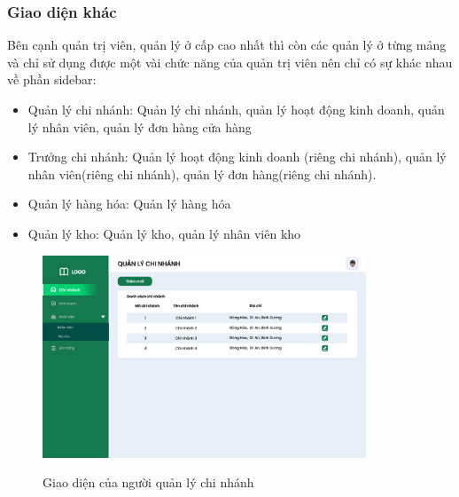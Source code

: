     \subsubsection{Giao diện khác}
        Bên cạnh quản trị viên, quản lý ở cấp cao nhất thì còn các quản lý ở từng mảng và chỉ sử dụng được một vài chức năng của quản trị viên nên chỉ có sự khác nhau về phần sidebar:
        \begin{itemize}
            \item Quản lý chi nhánh: Quản lý chi nhánh, quản lý hoạt động kinh doanh, quản lý nhân viên, quản lý đơn hàng cửa hàng
            \item Trưởng chi nhánh: Quản lý hoạt động kinh doanh (riêng chi nhánh), quản lý nhân viên(riêng chi nhánh), quản lý đơn hàng(riêng chi nhánh).
            \item Quản lý hàng hóa: Quản lý hàng hóa
            \item Quản lý kho: Quản lý kho, quản lý nhân viên kho
        \end{itemize}
            \begin{figure}[!htp]
                \centering
                \includegraphics[width=3.8in]{img/UI/admin/sub-admin. Quản lý chi nhánh.png}
                \label{44}
                \newline
                \caption{Giao diện của người quản lý chi nhánh}
            \end{figure}
        
